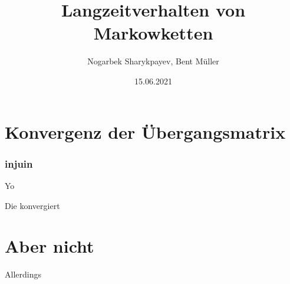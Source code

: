 \documentclass[compress]{beamer}
\title{Langzeitverhalten von Markowketten}
\author{Nogarbek Sharykpayev, Bent Müller}
\institute{Universität Hamburg}
\date{15.06.2021}
\begin{document}
\frame{\titlepage}
	\section{Konvergenz der Übergangsmatrix}
	\begin{frame}
		\frametitle{injuin}
		Yo
	\end{frame}

	\begin{frame}
		Die konvergiert
	\end{frame}

	\section{Aber nicht}
	\begin{frame}
		Allerdings
	\end{frame}
\end{document}
